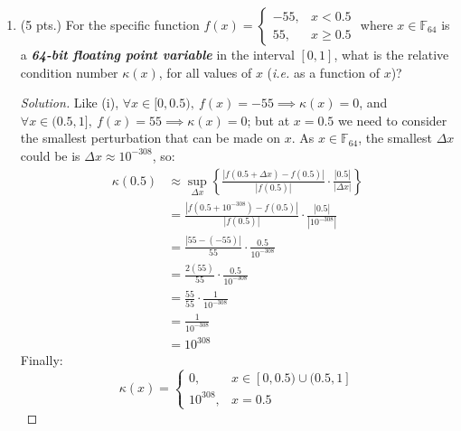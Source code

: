 \documentclass[12pt]{article}
\newcommand{\abs}[1]{\left|#1\right|}
\newcommand{\parens}[1]{\left(#1\right)}
\newcommand{\bracks}[1]{\left\{#1\right\}}
\newcommand{\bfit}[1]{\textbf{\textit{#1}}}
\begin{document}
\begin{enumerate}
\begin{enumerate}
\begin{enumerate}
     \item (5 pts.) For the specific function $f(x) = \left\{
         \begin{array}{rl} -55, & x<0.5 \\ 55, & x\ge 0.5 \end{array} \right.$
       where $x\in\mathbb{F}_{64}$ is a \bfit{64-bit floating point variable}
       in the interval $[0,1]$, what is the relative condition number
       $\kappa(x)$, for all values of $x$ (\emph{i.e.}\/ as a function of
       $x$)?
       \begin{proof}[Solution]
       Like (i), $\forall x \in [0, 0.5),\ f(x) = -55 \implies \kappa(x) = 0$, and $\forall x \in (0.5, 1],\ f(x) = 55 \implies \kappa(x) = 0$; but at $x = 0.5$ we need to consider the smallest perturbation that can be made on $x$. As $x \in \mathbb{F}_{64}$, the smallest $\Delta x$ could be is $\Delta x \approx 10^{-308}$, so:
       \begin{align*}
       \kappa\parens{0.5} &\approx \sup_{\Delta x}\bracks{\frac{\abs{f\parens{0.5 + \Delta x} - f(0.5)}}{\abs{f(0.5)}}\cdot\frac{\abs{0.5}}{\abs{\Delta x}}}\\
       &= \frac{\abs{f\parens{0.5 + 10^{-308}} - f(0.5)}}{\abs{f(0.5)}}\cdot\frac{\abs{0.5}}{\abs{10^{-308}}}\\
       &= \frac{\abs{55 - (-55)}}{55}\cdot\frac{0.5}{10^{-308}}\\
       &= \frac{2(55)}{55}\cdot\frac{0.5}{10^{-308}}\\
       &= \frac{55}{55}\cdot\frac{1}{10^{-308}}\\
       &= \frac{1}{10^{-308}}\\
       &= 10^{308}
       \end{align*}
       Finally:
       $$\kappa(x) = \left\{
         \begin{array}{rl} 0, & x \in [0,0.5)\cup(0.5,1] \\ 10^{308}, & x = 0.5 \end{array}
       \right.$$
       \end{proof}




\end{enumerate}
\end{enumerate}
\end{enumerate}
\end{document}
